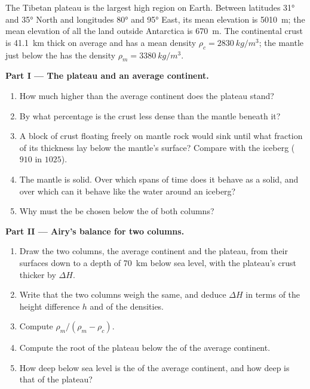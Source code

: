 \begin{problem}
\label{pb:g11:lithosphere-asthenosphere:1}
The Tibetan plateau is the largest high region on Earth. Between latitudes
\ang{31} and \ang{35} North and longitudes \ang{80} and \ang{95} East, its
mean elevation is \qty{5010}{m}; the mean elevation of all the land outside
Antarctica is \qty{670}{m}. The continental crust is \qty{41.1}{km} thick on
average and has a mean density $\rho_c = \qty{2830}{kg/m^3}$; the mantle just
below the  has the density $\rho_m = \qty{3380}{kg/m^3}$.

\medskip
\noindent\textbf{Part I --- The plateau and an average continent.}
\begin{enumerate}
  \item How much higher than the average continent does the plateau stand?
  \item By what percentage is the crust less dense than the mantle beneath it?
  \item A block of crust floating freely on mantle rock would sink until what
        fraction of its thickness lay below the mantle's surface? Compare with
        the iceberg ($910$ in $1025$).
  \item The mantle is solid. Over which spans of time does it behave as a
        solid, and over which can it behave like the water around an
        iceberg?
  \item Why must the  be chosen below the  of both
        columns?
\end{enumerate}

\medskip
\noindent\textbf{Part II --- Airy's balance for two columns.}
\begin{enumerate}[resume]
  \item Draw the two columns, the average continent and the plateau, from
        their surfaces down to a depth of \qty{70}{km} below sea level, with
        the plateau's crust thicker by $\Delta H$.
  \item Write that the two columns weigh the same, and deduce $\Delta H$ in
        terms of the height difference $h$ and of the densities.
  \item Compute $\rho_m/(\rho_m - \rho_c)$.
  \item Compute the root of the plateau below the  of the average
        continent.
  \item How deep below sea level is the  of the average continent, and
        how deep is that of the plateau?
\end{enumerate}


\end{problem}
